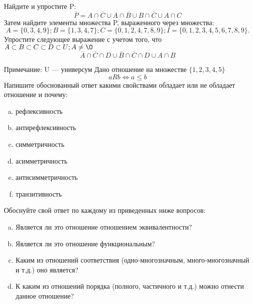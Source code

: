 \documentclass[10pt]{exam}
\begin{document}
\begin{questions}
\question
Найдите и упростите P:
\begin{equation*}
\overline{P} = A \cap \overline{C} \cup A \cap \overline{B} \cup B \cap \overline{C} \cup A \cap C
\end{equation*}
Затем найдите элементы множества P, выраженного через множества:
\begin{equation*}
A = \{0, 3, 4, 9\}; 
B = \{1, 3, 4, 7\};
C = \{0, 1, 2, 4, 7, 8, 9\};
I = \{0, 1, 2, 3, 4, 5, 6, 7, 8, 9\}.
\end{equation*}\question
Упростите следующее выражение с учетом того, что $A\subset B \subset C \subset D \subset U; A \neq \O$
\begin{equation*}
\overline{A} \cap \overline{C} \cap D \cup \overline{B} \cap \overline{C} \cap D \cup A \cap B
\end{equation*}

Примечание: U — универсум\question
Дано отношение на множестве $\{1, 2, 3, 4, 5\}$ 
\begin{equation*}
aRb \iff a \leq b
\end{equation*}
Напишите обоснованный ответ какими свойствами обладает или не обладает отношение и почему:   
\begin{enumerate} [a)]\setcounter{enumi}{0}
\item рефлексивность
\item антирефлексивность
\item симметричность
\item асимметричность
\item антисимметричность
\item транзитивность
\end{enumerate}

Обоснуйте свой ответ по каждому из приведенных ниже вопросов:
\begin{enumerate} [a)]\setcounter{enumi}{0}
    \item Является ли это отношение отношением эквивалентности?
    \item Является ли это отношение функциональным?
    \item Каким из отношений соответствия (одно-многозначным, много-многозначный и т.д.) оно является?
    \item К каким из отношений порядка (полного, частичного и т.д.) можно отнести данное отношение?
\end{enumerate}



\end{questions}
\end{document}
